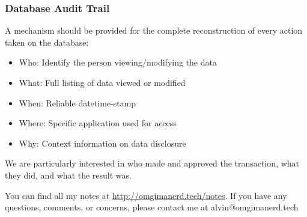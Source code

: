 \documentclass{math}
\begin{document}
\subsubsection*{Database Audit Trail}
A mechanism should be provided for the complete reconstruction of every action
taken on the database:
\begin{itemize}
  \item Who: Identify the person viewing/modifying the data
  \item What: Full listing of data viewed or modified
  \item When: Reliable datetime-stamp
  \item Where: Specific application used for access
  \item Why: Context information on data disclosure
\end{itemize}
We are particularly interested in who made and approved the transaction,
what they did, and what the result was.

\begin{center}
  You can find all my notes at \url{http://omgimanerd.tech/notes}. If you have
  any questions, comments, or concerns, please contact me at
  alvin@omgimanerd.tech
\end{center}
\end{document}

